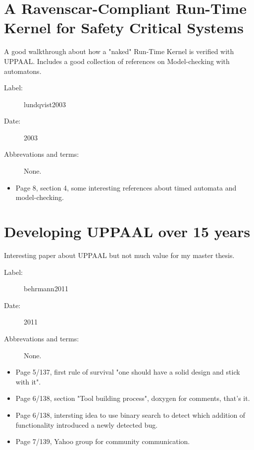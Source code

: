 \section{A Ravenscar-Compliant Run-Time Kernel for Safety Critical Systems}
A good walkthrough about how a "naked" Run-Time Kernel is verified with UPPAAL.
Includes a good collection of references on Model-checking with automatons.

\begin{description}
    \item[Label:] lundqvist2003 \cite{lundqvist2003}
    \item[Date:] 2003
    \item[Abbrevations and terms:] None.
\end{description}

\begin{itemize}
    \item Page 8, section 4, some interesting references about timed automata
        and model-checking.
\end{itemize}

\section{Developing UPPAAL over 15 years}
Interesting paper about UPPAAL but not much value for my master thesis.

\begin{description}
    \item[Label:] behrmann2011 \cite{behrmann2011}
    \item[Date:] 2011
    \item[Abbrevations and terms:] None.
\end{description}

\begin{itemize}
    \item Page 5/137, first rule of survival "one should have a solid design
        and stick with it".
    \item Page 6/138, section "Tool building process", doxygen for comments,
        that's it.
    \item Page 6/138, intersting idea to use binary search to detect which
        addition of functionality introduced a newly detected bug.
    \item Page 7/139, Yahoo group for community communication.
\end{itemize}

